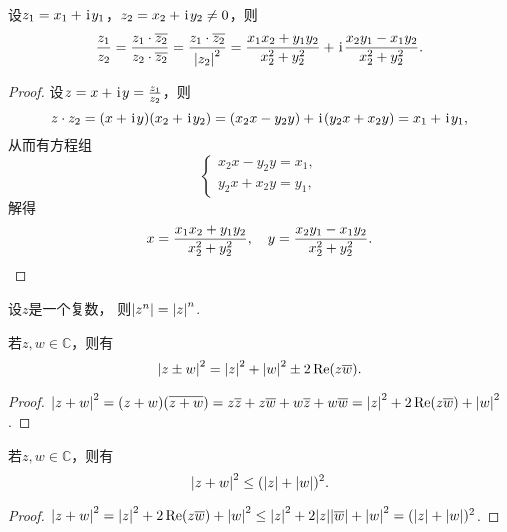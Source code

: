 \begin{theorem}
设\(z_1 = x_1 + \kern1pt\mathrm{i}\kern1pt y_1\)，\(z_2 = x_2 + \kern1pt\mathrm{i}\kern1pt y_2 \neq 0\)，则\begin{equation*}
	\frac{z_1}{z_2}
	= \frac{z_1 \cdot \overline{z_2}}{z_2 \cdot \overline{z_2}}
	= \frac{z_1 \cdot \overline{z_2}}{\abs{z_2}^2}
	= \frac{x_1 x_2 + y_1 y_2}{x_2^2 + y_2^2}
	+ \kern1pt\mathrm{i}\kern1pt \frac{x_2 y_1 - x_1 y_2}{x_2^2 + y_2^2}.
\end{equation*}
\begin{proof}
设\(z = x + \kern1pt\mathrm{i}\kern1pt y = \frac{z_1}{z_2}\)，则\begin{equation*}
	z \cdot z_2 = (x + \kern1pt\mathrm{i}\kern1pt y)(x_2 + \kern1pt\mathrm{i}\kern1pt y_2)
	= (x_2 x - y_2 y) + \kern1pt\mathrm{i}\kern1pt(y_2 x + x_2 y)
	= x_1 + \kern1pt\mathrm{i}\kern1pt y_1,
\end{equation*}
从而有方程组\begin{equation*}
	\left\{ \begin{array}{l}
		x_2 x - y_2 y = x_1, \\
		y_2 x + x_2 y = y_1,
	\end{array} \right.
\end{equation*}
解得\begin{equation*}
	x = \frac{x_1 x_2 + y_1 y_2}{x_2^2 + y_2^2},
	\quad
	y = \frac{x_2 y_1 - x_1 y_2}{x_2^2 + y_2^2}.
	\qedhere
\end{equation*}
\end{proof}
\end{theorem}

\begin{property}
设\(z\)是一个复数，
则\(
	\abs{z^n}
	= \abs{z}^n
\).
\end{property}

\begin{theorem}
若\(z,w \in \mathbb{C}\)，则有\begin{equation}
	\abs{z \pm w}^2
	= \abs{z}^2 + \abs{w}^2 \pm 2 \Re(z \overline{w}).
\end{equation}
\begin{proof}
\(
	\abs{z + w}^2
	= (z + w) (\overline{z + w})
	= z\overline{z}
		+ z\overline{w}
		+ w\overline{z}
		+ w\overline{w}
	= \abs{z}^2 + 2 \Re(z\overline{w}) + \abs{w}^2
\).
\end{proof}
\end{theorem}

\begin{theorem}
若\(z,w \in \mathbb{C}\)，则有\begin{equation}
	\abs{z + w}^2 \leq (\abs{z} + \abs{w})^2.
\end{equation}
\begin{proof}
\(
	\abs{z + w}^2
	= \abs{z}^2 + 2 \Re(z \overline{w}) + \abs{w}^2
	\leq \abs{z}^2 + 2 \abs{z}\abs{\overline{w}} + \abs{w}^2
	= (\abs{z} + \abs{w})^2
\).
\end{proof}
\end{theorem}

